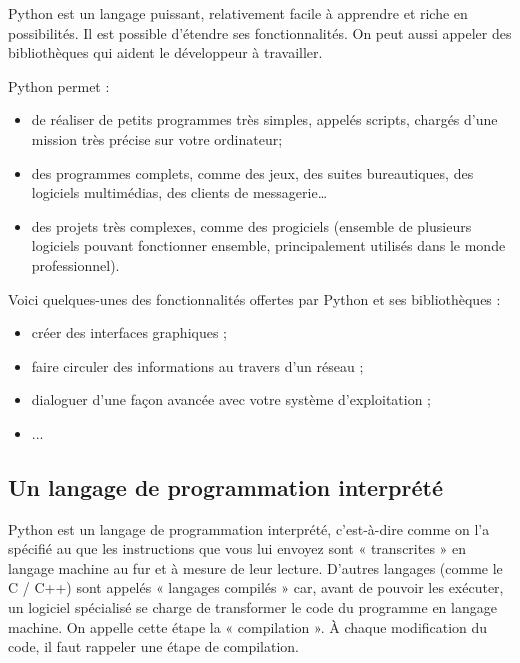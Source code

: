 \documentclass[11pt,oneside]{article}
\begin{document}
Python est un langage puissant, relativement facile à apprendre et riche en possibilités. Il est possible d'étendre ses fonctionnalités. On peut aussi appeler des bibliothèques qui aident le développeur à travailler. 


Python permet :
\begin{itemize}
\item de réaliser de petits programmes très simples, appelés scripts, chargés d'une mission très précise sur votre ordinateur;
\item des programmes complets, comme des jeux, des suites bureautiques, des logiciels multimédias, des clients de messagerie…
\item des projets très complexes, comme des progiciels (ensemble de plusieurs logiciels pouvant fonctionner ensemble, principalement utilisés dans le monde professionnel).
\end{itemize}

Voici quelques-unes des fonctionnalités offertes par Python et ses bibliothèques :
\begin{itemize}
\item créer des interfaces graphiques ;
\item faire circuler des informations au travers d'un réseau ;
\item dialoguer d'une façon avancée avec votre système d'exploitation ;
\item ...
\end{itemize}

\subsection{ Un langage de programmation interprété}
Python est un langage de programmation interprété, c'est-à-dire comme on l'a spécifié au que les instructions que vous lui envoyez sont « transcrites » en langage machine au fur et à mesure de leur lecture. D'autres langages (comme le C / C++) sont appelés « langages compilés » car, avant de pouvoir les exécuter, un logiciel spécialisé se charge de transformer le code du programme en langage machine. On appelle cette étape la « compilation ». À chaque modification du code, il faut rappeler une étape de compilation.
\end{document}
